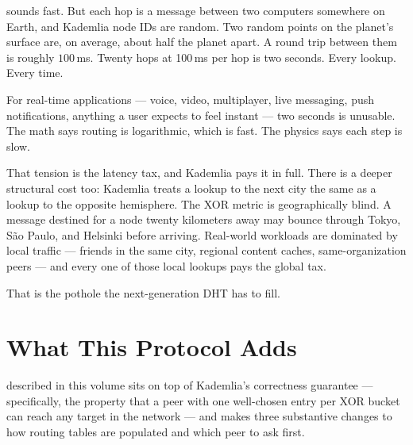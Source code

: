 \documentclass[twoside,nobib]{tufte-book}
\begin{document}
 sounds fast. But each hop is a message
between two computers somewhere on Earth, and Kademlia node IDs are
random. Two random points on the planet's surface are, on average,
about half the planet apart. A round trip between them is roughly
$100$\,ms. Twenty hops at 100\,ms
per hop is two seconds. Every lookup. Every time.

For real-time applications --- voice, video, multiplayer, live
messaging, push notifications, anything a user expects to feel
instant --- two seconds is unusable. The math says routing is
logarithmic, which is fast. The physics says each step is slow.

That tension is the latency tax, and Kademlia pays it in full. There
is a deeper structural cost too: Kademlia treats a lookup to the next
city the same as a lookup to the opposite hemisphere. The XOR metric
is geographically blind. A message destined for a node twenty
kilometers away may bounce through Tokyo, S\~ao Paulo, and Helsinki
before arriving. Real-world workloads are dominated by local
traffic ---
friends in the same city, regional content caches,
same-organization peers --- and every one of those local lookups
pays the global tax.

That is the pothole the next-generation DHT has to fill.

\section{What This Protocol Adds}

 described in this volume sits on top of
Kademlia's correctness guarantee --- specifically, the property
that a peer with one well-chosen entry per XOR bucket can reach
any target in the network --- and makes three substantive changes
to how routing tables are populated and which peer to ask first.
\end{document}
